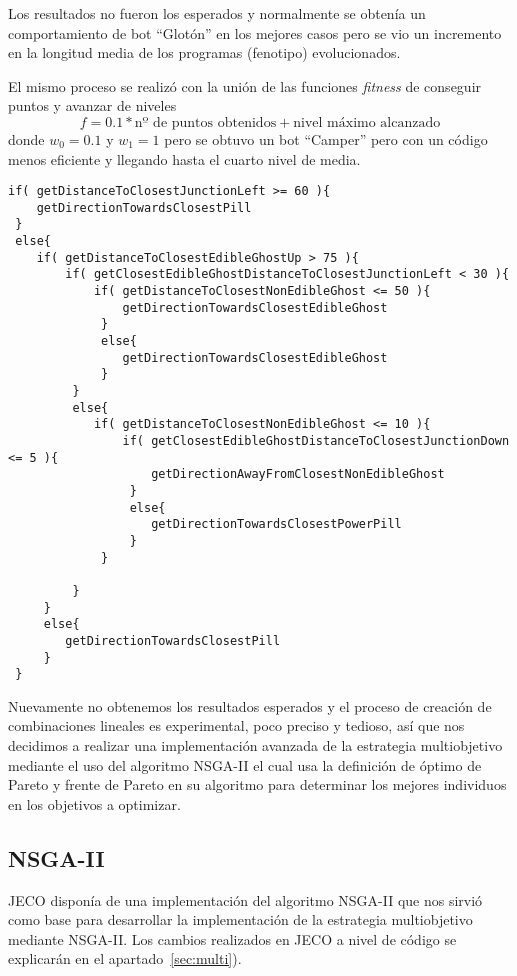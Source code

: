Los resultados no fueron los esperados y normalmente se obtenía un comportamiento de bot ``Glotón'' en los mejores casos pero se vio un incremento en la longitud media de los programas (fenotipo) evolucionados.

El mismo proceso se realizó con la unión de las funciones \textit{fitness} de conseguir puntos y avanzar de niveles
\begin{equation*}
f = 0.1 * \textrm{nº de puntos obtenidos} + \textrm{nivel máximo alcanzado}
\end{equation*}
donde $w_0 = 0.1$ y $w_1 = 1$ pero se obtuvo un bot ``Camper'' pero con un código menos eficiente y llegando hasta el cuarto nivel de media.

\begin{lstlisting}[caption={Código del bot Camper obtenido mediante funciones agregativas.}]
if( getDistanceToClosestJunctionLeft >= 60 ){ 
    getDirectionTowardsClosestPill
 }
 else{ 
    if( getDistanceToClosestEdibleGhostUp > 75 ){ 
        if( getClosestEdibleGhostDistanceToClosestJunctionLeft < 30 ){ 
            if( getDistanceToClosestNonEdibleGhost <= 50 ){ 
                getDirectionTowardsClosestEdibleGhost
             }
             else{ 
                getDirectionTowardsClosestEdibleGhost
             }
         }
         else{ 
            if( getDistanceToClosestNonEdibleGhost <= 10 ){ 
                if( getClosestEdibleGhostDistanceToClosestJunctionDown <= 5 ){ 
                    getDirectionAwayFromClosestNonEdibleGhost
                 }
                 else{ 
                    getDirectionTowardsClosestPowerPill
                 }
             }
 
         }
     }
     else{ 
        getDirectionTowardsClosestPill
     }
 }
\end{lstlisting}

Nuevamente no obtenemos los resultados esperados y el proceso de creación de combinaciones lineales es experimental, poco preciso y tedioso, así que nos decidimos a realizar una implementación avanzada de la estrategia multiobjetivo mediante el uso del algoritmo NSGA-II el cual usa la definición de óptimo de Pareto y frente de Pareto en su algoritmo para determinar los mejores individuos en los objetivos a optimizar.

\subsection{NSGA-II}
JECO disponía de una implementación del algoritmo NSGA-II que nos sirvió como base para desarrollar la implementación de la estrategia multiobjetivo mediante NSGA-II. Los cambios realizados en JECO a nivel de código se explicarán en el apartado~\ref{sec:multi}).
 
